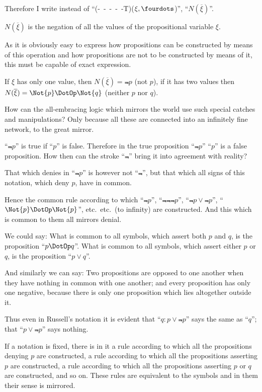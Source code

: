 {Therefore I write instead of \mbox{``(- - - - -T)}\AllowBreak($\xi, \fourdots$)'',
``$N(\overline{\xi})$''.

$N(\overline{\xi})$ is the negation of all the values of the
propositional variable $\xi$.}


{As it is obviously easy to express how propositions
can be constructed by means of this operation
and how propositions are not to be constructed by
means of it, this must be capable of exact expression.}


{If $\xi$ has only one value, then $N(\overline{\xi}) = \Not{p}$ (not $p$),
if it has two values then $N(\overline{\xi}) = \Not{p} \DotOp \Not{q}$ (neither
$p$ nor $q$).}


{How can the all-embracing logic which mirrors
the world use such special catches and manipulations?
Only because all these are connected into
an infinitely fine network, to the great mirror.}


{``$\Not{p}$'' is true if ``$p$'' is false. Therefore in the
true proposition ``$\Not{p}$'' ``$p$'' is a false proposition.
How then can the stroke ``$\Not{}$'' bring it into
agreement with reality?

That which denies in ``$\Not{p}$'' is however not
``$\Not{}$'', but that which all signs of this notation,
which deny $p$, have in common.

Hence the common rule according to which
``$\Not{p}$'', ``$\Not{\Not{\Not{p}}}$'', ``${\Not{p}} \lor {\Not{p}}$'', ``$\Not{p} \DotOp \Not{p}$'',
etc.\ etc.\ (to infinity) are constructed. And this
which is common to them all mirrors denial.}


{We could say: What is common to all symbols,
which assert both $p$ and $q$, is the proposition
``$p \DotOp q$''. What is common to all symbols, which
assert either $p$ or $q$, is the proposition ``$p \lor q$''.

And similarly we can say: Two propositions
are opposed to one another when they have
nothing in common with one another; and every
proposition has only one negative, because there
is only one proposition which lies altogether
outside it.

Thus even in Russell's notation it is evident
that ``${q : p} \lor {\Not{p}}$'' says the same as ``$q$''; that
``$p \lor {\Not{p}}$'' says nothing.}


{If a notation is fixed, there is in it a rule according
to which all the propositions denying $p$ are
constructed, a rule according to which all the
propositions asserting $p$ are constructed, a rule
according to which all the propositions asserting
$p$ or $q$ are constructed, and so on. These rules
are equivalent to the symbols and in them their
sense is mirrored.}


